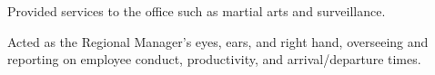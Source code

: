 \begin{achievements}
	\item Provided services to the office such as martial arts and surveillance.
	\item Acted as the Regional Manager's eyes, ears, and right hand, overseeing and reporting on employee conduct, productivity, and arrival/departure times.
\end{achievements}
